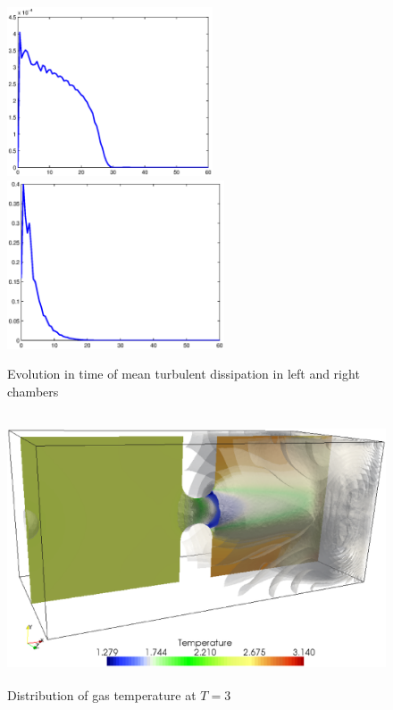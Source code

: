 \begin{figure}[bhpt] 
\centerline{ 
\includegraphics[height=5.0cm]
{chapters/hoffman-3/eps/tur_disp_l.eps}
\includegraphics[height=5.0cm]
{chapters/hoffman-3/eps/tur_disp_r.eps}
} 
\caption{Evolution in time of mean turbulent dissipation in left and right
chambers}
\label{tur_disipation} 
\end{figure}



\begin{figure}[bhpt] 
\centerline{ 
\includegraphics[height=8.0cm]
{chapters/hoffman-3/eps/Tem_T_3.eps}
} 
\caption{Distribution of gas temperature at $T=3$}
\label{temp3} 
\end{figure}


